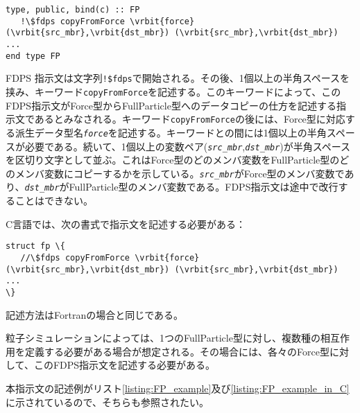 \begin{screen}
\begin{Verbatim}[commandchars=\\\{\}]
type, public, bind(c) :: FP
   !\$fdps copyFromForce \vrbit{force} (\vrbit{src_mbr},\vrbit{dst_mbr}) (\vrbit{src_mbr},\vrbit{dst_mbr}) ...
end type FP
\end{Verbatim}
\end{screen}
FDPS 指示文は文字列\verb|!$fdps|で開始される。その後、1個以上の半角スペースを挟み、キーワード\texttt{copyFromForce}を記述する。このキーワードによって、このFDPS指示文がForce型からFullParticle型へのデータコピーの仕方を記述する指示文であるとみなされる。キーワード\texttt{copyFromForce}の後には、Force型に対応する派生データ型名\textit{\texttt{force}}を記述する。キーワードとの間には1個以上の半角スペースが必要である。続いて、1個以上の変数ペア(\textit{\texttt{src\_mbr}},\textit{\texttt{dst\_mbr}})が半角スペースを区切り文字として並ぶ。これはForce型のどのメンバ変数をFullParticle型のどのメンバ変数にコピーするかを示している。\textit{\texttt{src\_mbr}}がForce型のメンバ変数であり、\textit{\texttt{dst\_mbr}}がFullParticle型のメンバ変数である。FDPS指示文は途中で改行することはできない。

C言語では、次の書式で指示文を記述する必要がある：
\begin{screen}
\begin{Verbatim}[commandchars=\\\{\}]
struct fp \{
   //\$fdps copyFromForce \vrbit{force} (\vrbit{src_mbr},\vrbit{dst_mbr}) (\vrbit{src_mbr},\vrbit{dst_mbr}) ...
\}
\end{Verbatim}
\end{screen}
記述方法はFortranの場合と同じである。


粒子シミュレーションによっては、1つのFullParticle型に対し、複数種の相互作用を定義する必要がある場合が想定される。その場合には、各々のForce型に対して、このFDPS指示文を記述する必要がある。

本指示文の記述例がリスト\ref{listing:FP_example}及び\ref{listing:FP_example_in_C}に示されているので、そちらも参照されたい。


